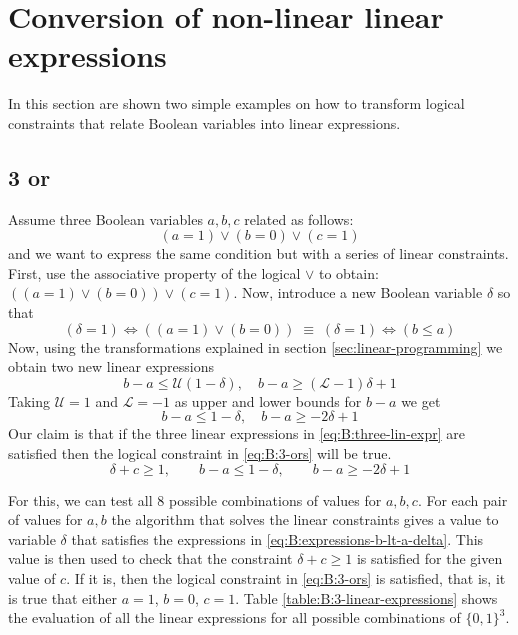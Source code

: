 \section{Conversion of non-linear linear expressions}
\label{sec:conv-non-linear}

In this section are shown two simple examples on how to transform logical
constraints that relate Boolean variables into linear expressions.

\subsection{3 or}
\label{sec:conv-non-linear:3-ors}

Assume three Boolean variables $a,b,c$ related as follows:
\begin{equation}
\label{eq:B:3-ors}
(a = 1) \vee (b = 0) \vee (c = 1)
\end{equation}
and we want to express the same condition but with a series of
linear constraints. First, use the associative property of the logical $\vee$
to obtain: $((a = 1) \vee (b = 0)) \vee (c = 1)$.
Now, introduce a new Boolean variable $\delta$ so that
\[
(\delta = 1) \Longleftrightarrow ((a = 1) \vee (b = 0))
\;\equiv\;
(\delta = 1) \Longleftrightarrow (b \le a)
\]
Now, using the transformations explained in section \ref{sec:linear-programming}
we obtain two new linear expressions
\[
b - a \le \mathcal{U}(1 - \delta), \quad b - a \ge (\mathcal{L} - 1)\delta + 1
\]
Taking $\mathcal{U}=1$ and $\mathcal{L}=-1$ as upper and lower bounds for $b - a$
we get
\begin{equation}
\label{eq:B:expressions-b-lt-a-delta}
b - a \le 1 - \delta, \quad b - a \ge -2\delta + 1
\end{equation}
Our claim is that if the three linear expressions in \ref{eq:B:three-lin-expr}
are satisfied then the logical constraint in \ref{eq:B:3-ors} will be true.
\begin{equation}
\label{eq:B:three-lin-expr}
\delta + c \ge 1,\qquad b - a \le 1 - \delta,\qquad b - a \ge -2\delta + 1
\end{equation}

For this, we can test all 8 possible combinations of values for $a,b,c$. For each pair
of values for $a,b$ the algorithm that solves the linear constraints gives a value to
variable $\delta$ that satisfies the expressions in \ref{eq:B:expressions-b-lt-a-delta}.
This value is then used to check that the constraint $\delta + c \ge 1$ is satisfied
for the given value of $c$. If it is, then the logical constraint in \ref{eq:B:3-ors}
is satisfied, that is, it is true that either $a=1$, $b=0$, $c=1$. Table
\ref{table:B:3-linear-expressions} shows the evaluation of all the linear expressions
for all possible combinations of $\{0,1\}^3$.

